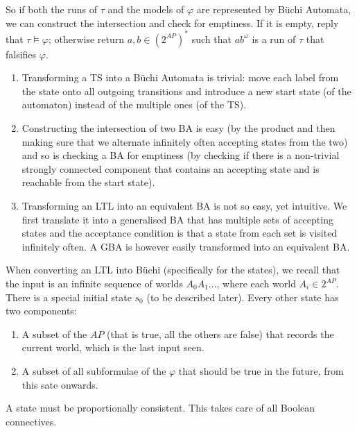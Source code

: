 So if both the runs of \(\tau\) and the models of \(\varphi\) are represented by B{\"u}chi Automata, we can construct the intersection and check for emptiness.
If it is empty, reply that \(\tau \models \varphi\); otherwise return \(a,b \in \left( 2^{AP} \right)^*\) such that \(ab^\omega\) is a run of \(\tau\) that falsifies \(\varphi\).

\begin{enumerate}
    \item Transforming a TS into a B{\"u}chi Automata is trivial: move each label from the state onto all outgoing transitions and introduce a new start state (of the automaton) instead of the multiple ones (of the TS).
    \item Constructing the intersection of two BA is easy (by the product and then making sure that we alternate infinitely often accepting states from the two) and so is checking a BA for emptiness (by checking if there is a non-trivial strongly connected component that contains an accepting state and is reachable from the start state).
    \item Transforming an LTL into an equivalent BA is not so easy, yet intuitive.
        We first translate it into a generalised BA that has multiple sets of accepting states and the acceptance condition is that a state from each set is visited infinitely often.
        A GBA is however easily transformed into an equivalent BA.
\end{enumerate}

When converting an LTL into B{\"u}chi (specifically for the states), we recall that the input is an infinite sequence of worlds \(A_0A_1...\), where each world \(A_i \in 2^{AP}\).
There is a special initial state \(s_0\) (to be described later).
Every other state has two components:
\begin{enumerate}
    \item A subset of the \(AP\) (that is true, all the others are false) that records the current world, which is the last input seen.
    \item A subset of all subformulae of the \(\varphi\) that should be true in the future, from this sate onwards.
\end{enumerate}
A state must be proportionally consistent.
This takes care of all Boolean connectives.

